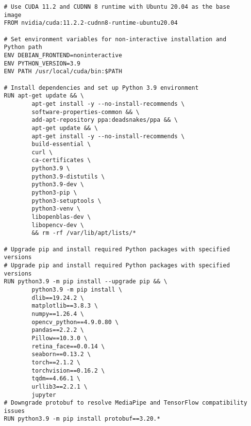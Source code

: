 \label{attachment:docker}


\begin{lstlisting}[style=dockerstyle, caption={Dockerfile pre rozpoznávanie emócií}, label={lst:dockerfile}]
# Use CUDA 11.2 and CUDNN 8 runtime with Ubuntu 20.04 as the base image
FROM nvidia/cuda:11.2.2-cudnn8-runtime-ubuntu20.04

# Set environment variables for non-interactive installation and Python path
ENV DEBIAN_FRONTEND=noninteractive
ENV PYTHON_VERSION=3.9
ENV PATH /usr/local/cuda/bin:$PATH

# Install dependencies and set up Python 3.9 environment
RUN apt-get update && \
        apt-get install -y --no-install-recommends \
        software-properties-common && \
        add-apt-repository ppa:deadsnakes/ppa && \
        apt-get update && \
        apt-get install -y --no-install-recommends \
        build-essential \
        curl \
        ca-certificates \
        python3.9 \
        python3.9-distutils \
        python3.9-dev \
        python3-pip \
        python3-setuptools \
        python3-venv \
        libopenblas-dev \
        libopencv-dev \
        && rm -rf /var/lib/apt/lists/*

# Upgrade pip and install required Python packages with specified versions
# Upgrade pip and install required Python packages with specified versions
RUN python3.9 -m pip install --upgrade pip && \
        python3.9 -m pip install \
        dlib==19.24.2 \
        matplotlib==3.8.3 \
        numpy==1.26.4 \
        opencv_python==4.9.0.80 \
        pandas==2.2.2 \
        Pillow==10.3.0 \
        retina_face==0.0.14 \
        seaborn==0.13.2 \
        torch==2.1.2 \
        torchvision==0.16.2 \
        tqdm==4.66.1 \
        urllib3==2.2.1 \
        jupyter
# Downgrade protobuf to resolve MediaPipe and TensorFlow compatibility issues
RUN python3.9 -m pip install protobuf==3.20.*


\end{lstlisting}

